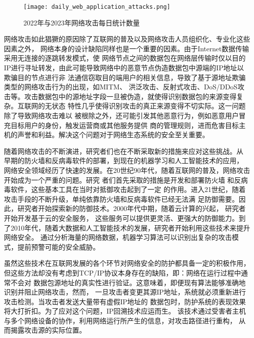 \begin{figure}[htbp]
  \centering
  \texttt{[image: daily\_web\_application\_attacks.png]}
  \caption{2022年与2023年网络攻击每日统计数量\cite{akamai}}
  \label{fig:daily_web_application_attacks}
\end{figure}

网络攻击如此猖獗的原因除了互联网的普及以及网络攻击人员组织化、专业化这些因素之外，
网络本身的设计缺陷同样也是一个重要的因素。由于Internet数据传输采用无连接的逐跳转发模式，使
网络节点之间的数据包在网络层传输时仅以目的IP进行寻址转发，由此可能导致网络中的恶意节点伪造数据包中源端的IP地址以欺骗目的节点进行非
法通信窃取目的端用户的相关信息，导致了基于源地址欺骗类型的网络攻击行为的出现，如MITM、
洪泛攻击、反射式攻击、DoS/DDoS攻击等\cite{zhen2022}。攻击数据包中的源地址字段一旦被伪造，就使得识别数据包的来源变得复杂。互联网的无状态
特性几乎使得识别攻击的真正来源变得不切实际\cite{singh2016}。这一问题除了导致网络攻击难以
被根除之外，还可能引发其他恶意行为，例如恶意用户冒充目标用户的身份，触发运营商或其他服务提供
商的管理规则，进而危害目标主机的声誉和利益。解决这个问题对于网络生态系统的安全至关重要。\par

随着网络攻击的不断演进，研究者们也在不断采取新的措施来应对这些挑战。从
早期的防火墙和反病毒软件的部署，到现在的机器学习和人工智能技术的应用，
网络安全领域经历了快速的发展。在20世纪90年代，随着互联网的普及，网络攻击开始成为一个严重的问题。研究
者们首先采取的措施是开发和部署防火墙\cite{Ioannidis2000DistributedFirewall}
和反病毒软件\cite{Cohen1983}，这些基本工具在当时对抵御攻击起到了一定
的作用。进入21世纪，随着攻击手段的不断升级，单纯依靠防火墙和反病毒软件已经无法满
足防御需要。因此，研究者开始探索新的防御技术。2000年代中期，随着云计算的兴起，
研究者开始开发基于云的安全服务\cite{Hashizume2013AnalysisSecurityCloud}，
这些服务可以提供更灵活、更强大的防御能力。到了2010年代，随着大数据和人工智能技术的发展，研究者开始利用这些技术来提升网络安全。
通过分析海量的网络数据，机器学习算法可以识别出复杂的攻击模式，提前预警可能的安全威胁。\par

虽然这些技术在互联网发展的各个环节对网络安全的防护都具备一定的积极作用，
但这些方法却没有考虑到TCP/IP协议本身存在的缺陷，即：网络在运行过程中通常不会对
数据包源地址的真实性进行验证。这意味着，即便现有算法能够准确地识别并阻止网络攻击，然而，
一旦攻击者变更其源IP地址，系统就必须重新进行攻击检测。当攻击者发送大量带有虚假IP地址的
数据包时，防护系统的表现效果将大打折扣。为了应对这个问题，IP回溯技术应运而生。
该技术通过受害者主机与多个网络设备的协作，利用网络运行所产生的信息，对攻击路径进行重构，
从而揭露攻击源的实际位置。\par 

